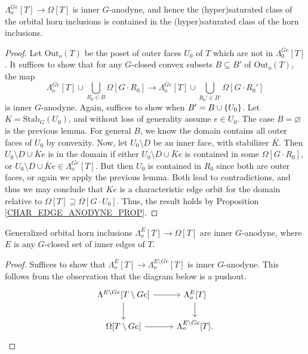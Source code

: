 \documentclass[a4paper,10pt,draft]{article}%
\numberwithin{equation}{section}%
\begin{document}
\begin{proposition}
      \label{ORB_HORN_PROP}
      $\Lambda_o^{Ge}[T] \to \Omega[T]$ is inner $G$-anodyne, and hence
      the (hyper)saturated class of the orbital horn inclusions is contained in
      the (hyper)saturated class of the horn inclusions.
\end{proposition}
\begin{proof}
      Let $\mathrm{Out}_o(T)$ be the poset of outer faces $U_0$ of $T$ which are not in $\Lambda_0^{Ge}[T]$.
      It suffices to show that for any $G$-closed convex subsets $B \subseteq B'$ of $\mathrm{Out}_o(T)$, the map
      \begin{equation}
            \Lambda_o^{Ge}[T] \cup \mathop{\bigcup}\limits_{R_0 \in B}\Omega[G \cdot R_0]
            \to
            \Lambda_o^{Ge}[T] \cup \mathop{\bigcup}\limits_{R_0' \in B'}\Omega[G \cdot R_0']
      \end{equation}
      is inner $G$-anodyne.
      Again, suffices to show when $B' = B \cup \left\{U_0\right\}$. Let $K = \mathrm{Stab}_G(U_0)$, and
      without loss of generality assume $e \in U_0$.
      The case $B = \varnothing$ is the previous lemma.
      For general $B$, we know the domain contains all outer faces of $U_0$ by convexity.
      Now, let $U_0 \setminus D$ be an inner face, with stabilizer $\bar K$.
      Then $U_0 \setminus D \cup \bar K e$ is in the domain if either
      $U_0 \setminus D \cup \bar K e$ is contained in some $\Omega[G \cdot R_0]$, or
      $U_0 \setminus D \cup \bar K e \in \Lambda_o^{Ge}[T]$.
      But then $U_0$ is contained in $R_0$ since both are outer faces, or again we apply the previous lemma.
      Both lead to contradictions, and thus we may conclude that
      $K e$ is a characteristic edge orbit for the domain relative to $\Omega[T] \supseteq \Omega[G \cdot U_0]$.
      Thus, the result holds by Proposition \ref{CHAR_EDGE_ANODYNE_PROP}.
\end{proof}

\begin{corollary}
      Generalized orbital horn inclusions $\Lambda^{E}_o[T] \to \Omega[T]$ are inner $G$-anodyne,
      where $E$ is any $G$-closed set of inner edges of $T$.
\end{corollary}
\begin{proof}
      Suffices to show that $\Lambda^{E}_o[T] \to \Lambda^{E \setminus G e}_o[T]$ is inner $G$-anodyne.
      This follows from the observation that the diagram below is a pushout.
      \begin{equation}
            \begin{tikzcd}
                  \Lambda^{E \setminus G e}[T \setminus G e] \arrow[d] \arrow[r]
                  &
                  \Lambda^E_o[T] \arrow[d]
                  \\
                  \Omega[T \setminus G e] \arrow[r]
                  &
                  \Lambda^{E \setminus G e}_o[T].
            \end{tikzcd}
      \end{equation}
\end{proof}
\end{document}
